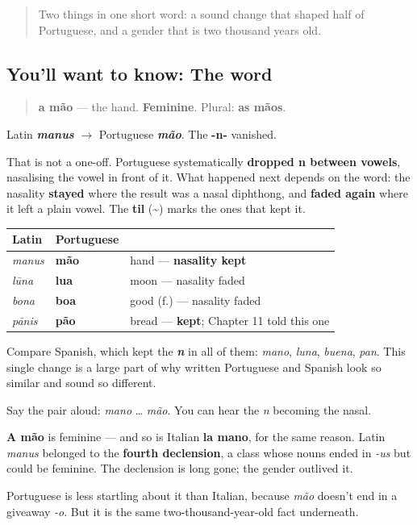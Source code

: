 \begin{quote}
Two things in one short word: a sound change that shaped half of Portuguese, and a gender that is two thousand years old.
\end{quote}

\subsection*{You'll want to know: The word}
\begin{quote}
\textbf{a mão} — the hand. \textbf{Feminine}. Plural: \textbf{as mãos}.
\end{quote}

\begin{cousinweb}
Latin \emph{\textbf{manus}} $\to$ Portuguese \emph{\textbf{mão}}. The \textbf{-n-} vanished.

That is not a one-off. Portuguese systematically \textbf{dropped n between vowels}, nasalising the vowel in front of it. What happened next depends on the word: the nasality \textbf{stayed} where the result was a nasal diphthong, and \textbf{faded again} where it left a plain vowel. The \textbf{til} (\textbf{\textasciitilde{}}) marks the ones that kept it.

\noindent
\begin{tabularx}{\linewidth}{@{}>{\raggedright\arraybackslash}X>{\raggedright\arraybackslash}X>{\raggedright\arraybackslash}X@{}}
\toprule
\textbf{Latin} & \textbf{Portuguese} & \textbf{} \\
\midrule
\emph{manus} & \textbf{mão} & hand — \textbf{nasality kept} \\
\emph{lūna} & \textbf{lua} & moon — nasality faded \\
\emph{bona} & \textbf{boa} & good (f.) — nasality faded \\
\emph{pānis} & \textbf{pão} & bread — \textbf{kept}; Chapter 11 told this one \\
\bottomrule
\end{tabularx}

Compare Spanish, which kept the \emph{\textbf{n}} in all of them: \emph{mano}, \emph{luna}, \emph{buena}, \emph{pan}. This single change is a large part of why written Portuguese and Spanish look so similar and sound so different.

Say the pair aloud: \emph{mano} … \emph{mão}. You can hear the \emph{n} becoming the nasal.
\end{cousinweb}

\begin{grammarlens}[title={Grammar Lens: Feminine, like Italian's}]
\textbf{A mão} is feminine — and so is Italian \textbf{la mano}, for the same reason. Latin \emph{manus} belonged to the \textbf{fourth declension}, a class whose nouns ended in \emph{-us} but could be feminine. The declension is long gone; the gender outlived it.

Portuguese is less startling about it than Italian, because \emph{mão} doesn't end in a giveaway \emph{-o}. But it is the same two-thousand-year-old fact underneath.
\end{grammarlens}

